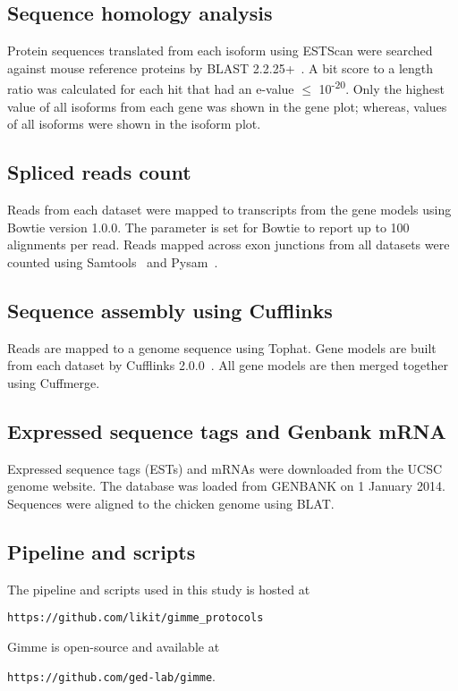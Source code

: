 \subsection{Sequence homology analysis}

Protein sequences translated from each isoform using ESTScan were searched
against mouse reference proteins by BLAST 2.2.25+~\cite{Tatusova:1999tz}.  A bit
score to a length ratio was calculated for each hit that had an e-value $\le$
10\textsuperscript{-20}.  Only the highest value of all isoforms from each gene
was shown in the gene plot; whereas, values of all isoforms were shown in the
isoform plot.

\subsection{Spliced reads count}

Reads from each dataset were mapped to transcripts from the gene models using
Bowtie version 1.0.0. The parameter is set for Bowtie to report up to 100
alignments per read.  Reads mapped across exon junctions from all datasets were
counted using Samtools~\cite{li2009sequence} and Pysam~\cite{pysam}.

\subsection{Sequence assembly using Cufflinks}
Reads are mapped to a genome sequence using Tophat.  Gene models are built from
each dataset by Cufflinks 2.0.0~\cite{Trapnell:2010kd}.  All gene models are
then merged together using Cuffmerge.

\subsection{Expressed sequence tags and Genbank mRNA}
Expressed sequence tags (ESTs) and mRNAs were downloaded from the UCSC genome
website.  The database was loaded from GENBANK on 1 January 2014.  Sequences
were aligned to the chicken genome using BLAT.

\subsection{Pipeline and scripts}

The pipeline and scripts used in this study is hosted at

\texttt{https://github.com/likit/gimme\_protocols}

\noindent
Gimme is open-source and available at

\texttt{https://github.com/ged-lab/gimme}.
